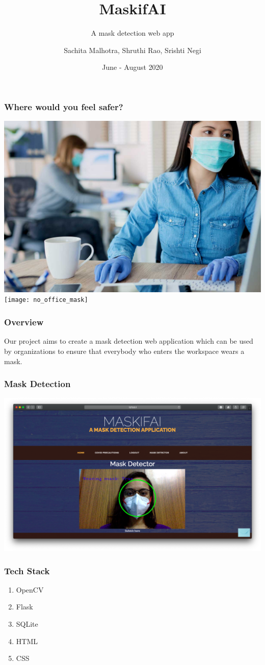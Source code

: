 \documentclass[14pt]{beamer}
\title{MaskifAI}
\subtitle{A mask detection web app}
\author[TEAM 6]{Sachita Malhotra, Shruthi Rao, Srishti Negi}
\date{June - August 2020}
\begin{document}
\begin{frame}
    \titlepage
\end{frame}

\begin{frame}
    \frametitle{Where would you feel safer?}
    \includegraphics[width=4.5 cm,height=3.5 cm]{office_mask}
    \texttt{[image: no\_office\_mask]}
\end{frame}

\begin{frame}
    \frametitle{Overview}
    Our project aims to create a mask detection web application which can be used by organizations to ensure that everybody who enters the workspace wears a mask.
\end{frame}

\begin{frame}
    \frametitle{Mask Detection}
    \includegraphics[scale=0.2]{mask_true}
\end{frame}

\begin{frame}
    \frametitle{Tech Stack}
    \begin{enumerate}
        \item OpenCV
        \item Flask
        \item SQLite
        \item HTML
        \item CSS
    \end{enumerate}
\end{frame} 
\end{document}
